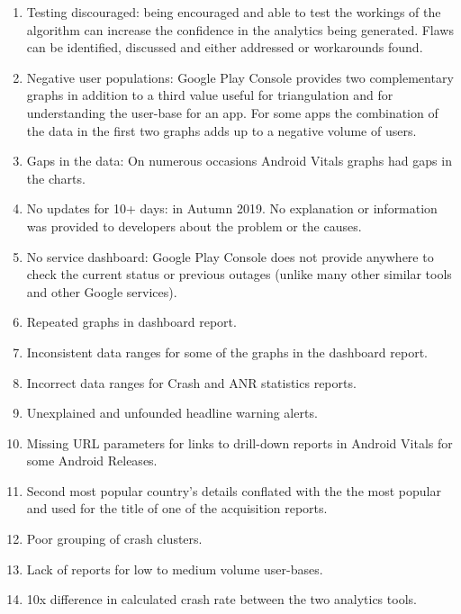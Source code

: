 \begin{enumerate}
    \item Testing discouraged: being encouraged and able to test the workings of the algorithm can increase the confidence in the analytics being generated. Flaws can be identified, discussed and either addressed or workarounds found.
    \item Negative user populations: Google Play Console provides two complementary graphs in addition to a third value useful for triangulation and for understanding the user-base for an app. For some apps the combination of the data in the first two graphs adds up to a negative volume of users.
    \item Gaps in the data: On numerous occasions Android Vitals graphs had gaps in the charts.
    \item No updates for 10+ days: in Autumn 2019. No explanation or information was provided to developers about the problem or the causes.
    \item No service dashboard: Google Play Console does not provide anywhere to check the current status or previous outages (unlike many other similar tools and other Google services).
    \item Repeated graphs in dashboard report.
    \item Inconsistent data ranges for some of the graphs in the dashboard report.
    \item Incorrect data ranges for Crash and ANR statistics reports.
    \item Unexplained and unfounded headline warning alerts.
    \item Missing URL parameters for links to drill-down reports in Android Vitals for some Android Releases.
    \item Second most popular country's details conflated with the the most popular and used for the title of one of the acquisition reports.
    \item Poor grouping of crash clusters.
    \item Lack of reports for low to medium volume user-bases.
    \item 10x difference in calculated crash rate between the two analytics tools.
\end{enumerate}

